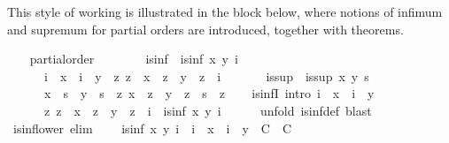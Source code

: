\begin{isabellebody}
\begin{isamarkuptext}
  This style of working is illustrated in the block below, where
  notions of infimum and supremum for partial orders are introduced,
  together with theorems.%
\end{isamarkuptext}%
\isamarkuptrue%
\ \ \isamarkupfalse%
\ partial{\isacharunderscore}order\ \isanewline
\isanewline
\ \ \isamarkupfalse%
\isanewline
\ \ \ \ is{\isacharunderscore}inf\ \ {\isachardoublequoteopen}is{\isacharunderscore}inf\ x\ y\ i\ {\isacharequal}\isanewline
\ \ \ \ \ \ {\isacharparenleft}i\ {\isasymsqsubseteq}\ x\ {\isasymand}\ i\ {\isasymsqsubseteq}\ y\ {\isasymand}\ {\isacharparenleft}{\isasymforall}z{\isachardot}\ z\ {\isasymsqsubseteq}\ x\ {\isasymand}\ z\ {\isasymsqsubseteq}\ y\ {\isasymlongrightarrow}\ z\ {\isasymsqsubseteq}\ i{\isacharparenright}{\isacharparenright}{\isachardoublequoteclose}\isanewline
\isanewline
\ \ \isamarkupfalse%
\isanewline
\ \ \ \ is{\isacharunderscore}sup\ \ {\isachardoublequoteopen}is{\isacharunderscore}sup\ x\ y\ s\ {\isacharequal}\isanewline
\ \ \ \ \ \ {\isacharparenleft}x\ {\isasymsqsubseteq}\ s\ {\isasymand}\ y\ {\isasymsqsubseteq}\ s\ {\isasymand}\ {\isacharparenleft}{\isasymforall}z{\isachardot}\ x\ {\isasymsqsubseteq}\ z\ {\isasymand}\ y\ {\isasymsqsubseteq}\ z\ {\isasymlongrightarrow}\ s\ {\isasymsqsubseteq}\ z{\isacharparenright}{\isacharparenright}{\isachardoublequoteclose}\isanewline
%
\isadeliminvisible
\isanewline
\ \ %
\endisadeliminvisible
%
\isataginvisible
{}\isamarkupfalse%
\ is{\isacharunderscore}infI\ {\isacharbrackleft}intro{\isacharquery}{\isacharbrackright}{\isacharcolon}\ {\isachardoublequoteopen}i\ {\isasymsqsubseteq}\ x\ {\isasymLongrightarrow}\ i\ {\isasymsqsubseteq}\ y\ {\isasymLongrightarrow}\isanewline
\ \ \ \ \ \ {\isacharparenleft}{\isasymAnd}z{\isachardot}\ z\ {\isasymsqsubseteq}\ x\ {\isasymLongrightarrow}\ z\ {\isasymsqsubseteq}\ y\ {\isasymLongrightarrow}\ z\ {\isasymsqsubseteq}\ i{\isacharparenright}\ {\isasymLongrightarrow}\ is{\isacharunderscore}inf\ x\ y\ i{\isachardoublequoteclose}\isanewline
\ \ \ \ \isamarkupfalse%
\ {\isacharparenleft}unfold\ is{\isacharunderscore}inf{\isacharunderscore}def{\isacharparenright}\ blast\isanewline
\isanewline
\ \ \isamarkupfalse%
\ is{\isacharunderscore}inf{\isacharunderscore}lower\ {\isacharbrackleft}elim{\isacharquery}{\isacharbrackright}{\isacharcolon}\isanewline
\ \ \ \ {\isachardoublequoteopen}is{\isacharunderscore}inf\ x\ y\ i\ {\isasymLongrightarrow}\ {\isacharparenleft}i\ {\isasymsqsubseteq}\ x\ {\isasymLongrightarrow}\ i\ {\isasymsqsubseteq}\ y\ {\isasymLongrightarrow}\ C{\isacharparenright}\ {\isasymLongrightarrow}\ C{\isachardoublequoteclose}\isanewline

\end{isabellebody}
